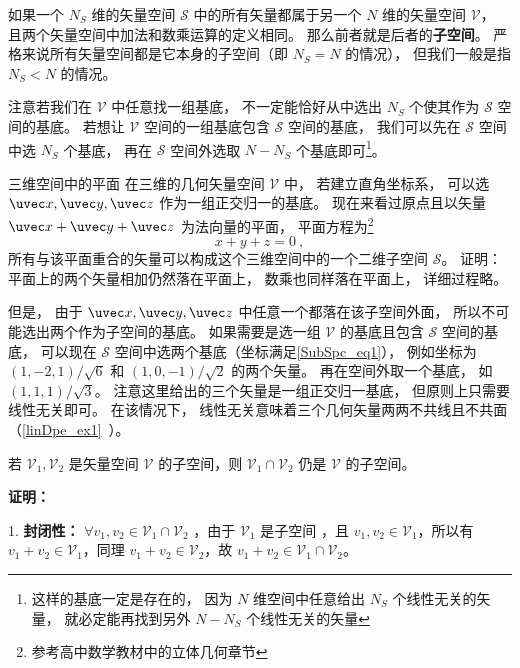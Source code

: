 

如果一个 $N_S$ 维的矢量空间 $\mathcal S$ 中的所有矢量都属于另一个 $N$ 维的矢量空间 $\mathcal V$， 且两个矢量空间中加法和数乘运算的定义相同。 那么前者就是后者的\textbf{子空间}。 严格来说所有矢量空间都是它本身的子空间（即 $N_S = N$ 的情况）， 但我们一般是指 $N_S < N$ 的情况。

注意若我们在 $\mathcal V$ 中任意找一组基底， 不一定能恰好从中选出 $N_S$ 个使其作为 $\mathcal S$ 空间的基底。 若想让 $\mathcal V$ 空间的一组基底包含 $\mathcal S$ 空间的基底， 我们可以先在 $\mathcal S$ 空间中选 $N_S$ 个基底， 再在 $\mathcal S$ 空间外选取 $N - N_S$ 个基底即可\footnote{这样的基底一定是存在的， 因为 $N$ 维空间中任意给出 $N_S$ 个线性无关的矢量， 就必定能再找到另外 $N - N_S$ 个线性无关的矢量}。

\begin{example}{三维空间中的平面}
在三维的几何矢量空间 $\mathcal V$ 中， 若建立直角坐标系， 可以选 $\uvec x, \uvec y, \uvec z$ 作为一组正交归一的基底。 现在来看过原点且以矢量 $\uvec x + \uvec y + \uvec z$ 为法向量的平面， 平面方程为\footnote{参考高中数学教材中的立体几何章节}
\begin{equation}\label{SubSpc_eq1}
x + y + z = 0~,
\end{equation}
所有与该平面重合的矢量可以构成这个三维空间中的一个二维子空间 $\mathcal S$。 证明： 平面上的两个矢量相加仍然落在平面上， 数乘也同样落在平面上， 详细过程略。 

但是， 由于 $\uvec x, \uvec y, \uvec z$ 中任意一个都落在该子空间外面， 所以不可能选出两个作为子空间的基底。 如果需要是选一组 $\mathcal V$ 的基底且包含 $\mathcal S$ 空间的基底， 可以现在 $\mathcal S$ 空间中选两个基底（坐标满足\autoref{SubSpc_eq1}）， 例如坐标为 $(1, -2, 1)/\sqrt{6}$ 和 $(1, 0, -1)/\sqrt{2}$ 的两个矢量。 再在空间外取一个基底， 如 $(1, 1, 1)/\sqrt{3}$。 注意这里给出的三个矢量是一组正交归一基底， 但原则上只需要线性无关即可。 在该情况下， 线性无关意味着三个几何矢量两两不共线且不共面（\autoref{linDpe_ex1}~）。
\end{example}
\begin{theorem}{}\label{SubSpc_the1}
若 $\mathcal V_1,\mathcal V_2$ 是矢量空间 $\mathcal V$ 的子空间，则 $\mathcal V_1\cap\mathcal V_2$ 仍是 $\mathcal V$ 的子空间。
\end{theorem}
\textbf{证明：}

1. \textbf{封闭性：} $\forall v_1,v_2\in\mathcal V_1\cap\mathcal V_2$ ，由于 $\mathcal V_1$ 是子空间 ，且 $v_1,v_2\in\mathcal V_1$，所以有 $v_1+v_2\in \mathcal V_1$，同理 $v_1+v_2\in \mathcal V_2$，故 $v_1+v_2\in \mathcal V_1\cap\mathcal V_2$。

